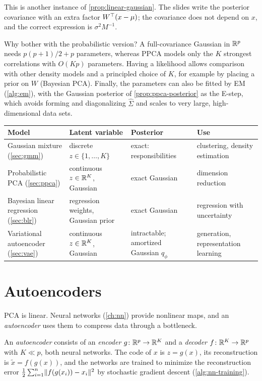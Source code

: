 This is another instance of \cref{prop:linear-gaussian}. The slides write the posterior covariance with an extra factor $W^{\top}(x-\mu)$; the covariance does not depend on $x$, and the correct expression is $\sigma^2M^{-1}$.

Why bother with the probabilistic version? A full-covariance Gaussian in $\mathbb{R}^p$ needs $p(p+1)/2+p$ parameters, whereas PPCA models only the $K$ strongest correlations with $O(Kp)$ parameters. Having a likelihood allows comparison with other density models and a principled choice of $K$, for example by placing a prior on $W$ (Bayesian PCA). Finally, the parameters can also be fitted by EM (\cref{alg:em}), with the Gaussian posterior of \cref{prop:ppca-posterior} as the E-step, which avoids forming and diagonalizing $\hat\Sigma$ and scales to very large, high-dimensional data sets.

\begin{center}
\small
\begin{tabularx}{\textwidth}{@{}l>{\raggedright\arraybackslash}X>{\raggedright\arraybackslash}X>{\raggedright\arraybackslash}X@{}}
\toprule
Model & Latent variable & Posterior & Use \\
\midrule
Gaussian mixture (\cref{sec:gmm}) & discrete $z\in\{1,\dots,K\}$ & exact: responsibilities & clustering, density estimation \\
Probabilistic PCA (\cref{sec:ppca}) & continuous $z\in\mathbb{R}^K$, Gaussian & exact Gaussian & dimension reduction \\
Bayesian linear regression (\cref{sec:blr}) & regression weights, Gaussian prior & exact Gaussian & regression with uncertainty \\
Variational autoencoder (\cref{sec:vae}) & continuous $z\in\mathbb{R}^K$, Gaussian & intractable; amortized Gaussian $q_\phi$ & generation, representation learning \\
\bottomrule
\end{tabularx}
\end{center}

\section{Autoencoders}\label{sec:autoencoder}

PCA is linear. Neural networks (\cref{ch:nn}) provide nonlinear maps, and an \emph{autoencoder} uses them to compress data through a bottleneck.

\begin{definition}[Autoencoder]\label{def:autoencoder}
An \emph{autoencoder} consists of an \emph{encoder} $g\colon\mathbb{R}^p\to\mathbb{R}^K$ and a \emph{decoder} $f\colon\mathbb{R}^K\to\mathbb{R}^p$ with $K\ll p$, both neural networks. The code of $x$ is $z=g(x)$, its reconstruction is $\tilde x=f(g(x))$, and the networks are trained to minimize the reconstruction error $\frac12\sum_{i=1}^n\lVert f(g(x_i))-x_i\rVert^2$ by stochastic gradient descent (\cref{alg:nn-training}).
\end{definition}

